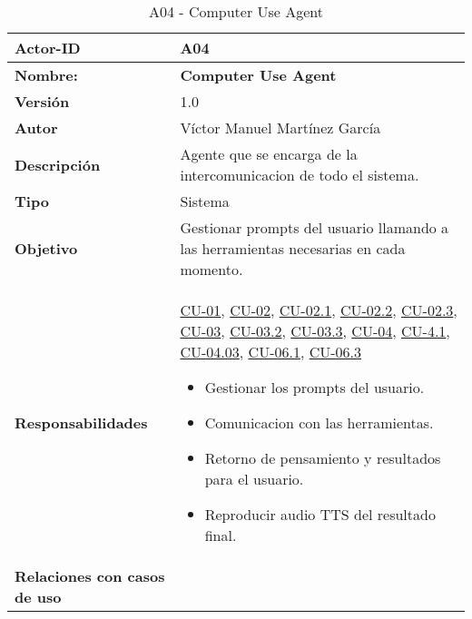 \begin{table}[H]
	\centering
	\begin{tabularx}{\linewidth}{ p{} p{} }
		\toprule
		\textbf{Actor-ID}    & A04 \\
		\toprule
		\textbf{Nombre: } 			  & \textbf{Computer Use Agent} \\
		\textbf{Versión}              & 1.0    \\
		\textbf{Autor}                & Víctor Manuel Martínez García \\
		\textbf{Descripción}          & Agente que se encarga de la intercomunicacion de todo el sistema.\\
		\textbf{Tipo}                 & Sistema \\
		\textbf{Objetivo}             & Gestionar prompts del usuario llamando a las herramientas necesarias en cada momento. \\
		\textbf{Responsabilidades}    & \hyperref[CU-01 Enviar prompt al sistema]{CU-01}, \hyperref[CU-02 Interpretar entorno grafico]{CU-02}, \hyperref[CU-02.1 Capturar imagen del sistema]{CU-02.1}, \hyperref[CU-02.2 Enviar Imagen a YOLO-Florence]{ CU-02.2}, \hyperref[CU-02.3 Obtenener descripcion del entorno visual]{CU-02.3}, \hyperref[CU-03 Realizar acciones en el sistema]{CU-03}, \hyperref[CU-03.2 Ejecutar accion solicitada]{CU-03.2}, \hyperref[CU-03.3 Confirmar ejecucion al usuario]{CU-03.3}, \hyperref[CU-04 Responder al usuario por voz]{CU-04}, \hyperref[CU-04.1 Generar respuesta textual]{CU-4.1}, \hyperref[CU-04.3 Reproducir respuesta por altavoz]{CU-04.03}, \hyperref[CU-06.1 Enviar prompt de busqueda a Browser-Use]{CU-06.1}, \hyperref[CU-06.3 Devolver información estructurada al CUA]{CU-06.3}
		\begin{itemize}
			\tightlist
			\item Gestionar los prompts del usuario.
            \item Comunicacion con las herramientas.
            \item Retorno de pensamiento y resultados para el usuario.
            \item Reproducir audio TTS del resultado final.
		\end{itemize}\\
		\textbf{Relaciones con casos de uso} & \\
		\bottomrule
	\end{tabularx}
	\caption{A04 - Computer Use Agent}
	\label{actor:Computer Use Agent}
\end{table}


